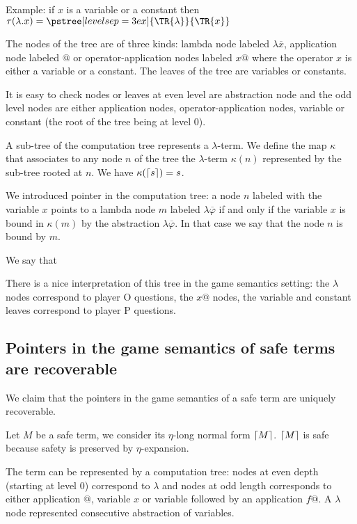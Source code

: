 Example: if $x$ is a variable or a constant then
$ \cmptre{\lambda . x} =
  \pstree[levelsep=3ex]
    { \TR{\lambda } }
    { \TR{x}
    }$

The nodes of the tree are of three kinds: lambda node labeled
 $\lambda \overline{x}$, application node labeled $@$ or
operator-application nodes labeled $x @$ where the operator $x$ is
either a variable or a constant. The leaves of the tree are
variables or constants.

It is easy to check nodes or leaves at even level are abstraction
node and the odd level nodes are either application nodes,
operator-application nodes, variable or constant (the root of the
tree being at level $0$).


A sub-tree of the computation tree represents a $\lambda$-term. We
define the map $\kappa$ that associates to any node $n$ of the tree
the $\lambda$-term $\kappa(n)$ represented by the sub-tree rooted at
$n$. We have $\kappa(\lceil s\rceil) = s$.

We introduced pointer in the computation tree: a node $n$ labeled
with the variable $x$ points to a lambda node $m$ labeled $\lambda
\overline{\varphi}$ if and only if the variable $x$ is bound in
$\kappa(m)$ by the abstraction $\lambda \overline{\varphi}$. In that
case we say that the node $n$ is bound by $m$.

\begin{dfn}[Regularity]
We say that
\end{dfn}

There is a nice interpretation of this tree in the game semantics setting: the $\lambda$ nodes
correspond to player O questions, the $x @$ nodes, the variable and constant leaves
correspond to player P questions.


\subsection{Pointers in the game semantics of safe terms are recoverable}

We claim that the pointers in the game semantics of a safe term are
uniquely recoverable.

Let $M$ be a safe term, we consider its $\eta$-long normal form $\lceil M\rceil$.
$\lceil M\rceil$ is safe because safety is preserved by $\eta$-expansion.


The term can be represented by a computation tree: nodes at even
depth (starting at level 0) correspond to $\lambda$ and nodes at odd
length corresponds to either application $@$, variable $x$ or
variable followed by an application $f@$. A $\lambda$ node
represented consecutive abstraction of variables.

